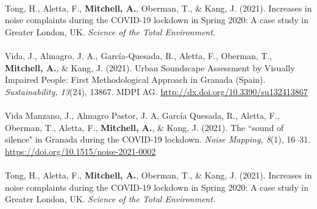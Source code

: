 \documentclass[oneside,fontsize=11pt,titlepage,chapterprefix=true
]{scrbook}
\begin{document}
\paragraph*{}Tong, H., Aletta, F., \textbf{Mitchell, A.}, Oberman, T., \& Kang, J. (2021). Increases in noise complaints during the COVID-19 lockdown in Spring 2020: A case study in Greater London, UK. \emph{Science of the Total Environment}.

\paragraph*{}
Vida, J., Almagro, J. A., García-Quesada, R., Aletta, F., Oberman, T., \textbf{Mitchell, A.}, \& Kang, J. (2021). Urban Soundscape Assessment by Visually Impaired People: First Methodological Approach in Granada (Spain). \emph{Sustainability, 13}(24), 13867. MDPI AG. \url{http://dx.doi.org/10.3390/su132413867}

\paragraph*{}
Vida Manzano, J., Almagro Pastor, J. A, Garc\'ia Quesada, R., Aletta, F., Oberman, T., Aletta, F., \textbf{Mitchell, A.}, \& Kang, J. (2021). The ``sound of silence" in Granada during the COVID-19 lockdown. \emph{Noise Mapping, 8}(1), 16--31. \url{https://doi.org/10.1515/noise-2021-0002}

\paragraph*{}Tong, H., Aletta, F., \textbf{Mitchell, A.}, Oberman, T., \& Kang, J. (2021). Increases in noise complaints during the COVID-19 lockdown in Spring 2020: A case study in Greater London, UK. \emph{Science of the Total Environment}.










\tableofcontents
\end{document}
